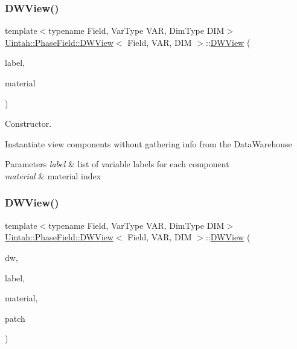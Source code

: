 \subsubsection{\texorpdfstring{D\+W\+View()}{DWView()}\hspace{0.1cm}{\footnotesize\ttfamily [1/3]}}
{\footnotesize\ttfamily template$<$typename Field, Var\+Type V\+AR, Dim\+Type D\+IM$>$ \\
\hyperlink{classUintah_1_1PhaseField_1_1DWView}{Uintah\+::\+Phase\+Field\+::\+D\+W\+View}$<$ Field, V\+AR, D\+IM $>$\+::\hyperlink{classUintah_1_1PhaseField_1_1DWView}{D\+W\+View} (\begin{DoxyParamCaption}\item[{const typename Field\+::label\+\_\+type \&}]{label,  }\item[{int}]{material }\end{DoxyParamCaption})\hspace{0.3cm}{\ttfamily [inline]}}



Constructor. 

Instantiate view components without gathering info from the Data\+Warehouse


\begin{DoxyParams}{Parameters}
{\em label} & list of variable labels for each component \\
\hline
{\em material} & material index \\
\hline
\end{DoxyParams}
\mbox{\label{classUintah_1_1PhaseField_1_1DWView_a47a9d33336fa123747e3f8df85845be3}} 
\subsubsection{\texorpdfstring{D\+W\+View()}{DWView()}\hspace{0.1cm}{\footnotesize\ttfamily [2/3]}}
{\footnotesize\ttfamily template$<$typename Field, Var\+Type V\+AR, Dim\+Type D\+IM$>$ \\
\hyperlink{classUintah_1_1PhaseField_1_1DWView}{Uintah\+::\+Phase\+Field\+::\+D\+W\+View}$<$ Field, V\+AR, D\+IM $>$\+::\hyperlink{classUintah_1_1PhaseField_1_1DWView}{D\+W\+View} (\begin{DoxyParamCaption}\item[{Data\+Warehouse $\ast$}]{dw,  }\item[{const typename Field\+::label\+\_\+type \&}]{label,  }\item[{int}]{material,  }\item[{const Patch $\ast$}]{patch }\end{DoxyParamCaption})\hspace{0.3cm}{\ttfamily [inline]}}



